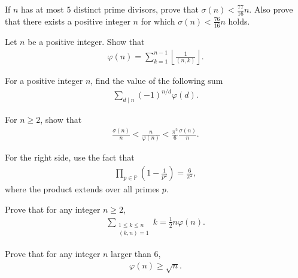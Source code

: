 \documentclass[12pt]{subfile}
\begin{document}
	\begin{problem}
		If $n$ has at most $5$ distinct prime divisors, prove that $\sigma(n) < \frac{77}{16} n.$ Also prove that there exists a positive integer $n$ for which $\sigma(n) < \frac{76}{16} n$ holds.
	\end{problem}

	\begin{problem}
		Let $n$ be a positive integer. Show that
			\begin{align*}
				\varphi(n)=\sum_{k=1}^{n-1} \left\lfloor\frac{1}{(n,k)} \right\rfloor.
			\end{align*}
	\end{problem}


	\begin{problem}
		For a positive integer $n$, find the value of the following sum
			\begin{align*}
				\sum\limits_{d\mid n} (-1)^{n/d} \varphi(d).
			\end{align*}
	\end{problem}

	\begin{problem}
		For $n \geq 2$, show that
			\begin{align*}
				\frac{\sigma(n)}{n} < \frac{n}{\varphi(n)} < \frac{\pi^{2}}{6} \frac{\sigma(n)}{n}.
			\end{align*}
	\end{problem}

	\begin{hint}
		For the right side, use the fact that
			\begin{align*}
				\prod_{p \in \mathbb P} \left(1 - \frac{1}{p^2}\right) = \frac{6}{\pi^2},
			\end{align*}
		where the product extends over all primes $p$.
	\end{hint}
	\begin{problem}
		Prove that for any integer $n\geq 2$,
			\begin{align*}
				 \sum_{\substack{1 \leq k \leq n \\ (k,n)=1}} k = \frac{1}{2}n\varphi(n).
			\end{align*}
	\end{problem}

	\begin{problem}
		Prove that for any integer $n$ larger than $6$,
			\begin{align*}
				\varphi(n) \geq \sqrt n.
			\end{align*}
	\end{problem}
\end{document}
